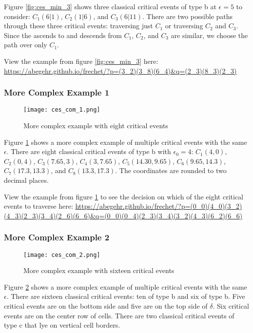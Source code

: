 Figure \ref{fig:ces_min_3} shows three classical critical events of type b at $\epsilon = 5$ to consider: $C_1(6|1)$, $C_2(1|6)$, and $C_3(6|11)$. There are two possible paths through these three critical events: traversing just $C_1$ or traversing $C_2$ and $C_3$. Since the ascends to and descends from $C_1$, $C_2$, and $C_3$ are similar, we choose the path over only $C_1$.

View the example from figure \ref{fig:ces_min_3} here: \url{https://abegehr.github.io/frechet/?p=(3_2)(3_8)(6_4)&q=(2_3)(8_3)(2_3)}


\subsubsection{More Complex Example 1}

\begin{figure}[H]
    \centering
    
    \texttt{[image: ces\_com\_1.png]}
		
	\caption{More complex example with eight critical events}
    \label{fig:ces_com_1}
\end{figure}

Figure \ref{fig:ces_com_1} shows a more complex example of multiple critical events with the same $\epsilon$. There are eight classical critical events of type b with $\epsilon_0 = 4$: $C_1(4, 0)$, $C_2(0, 4)$, $C_3(7.65, 3)$, $C_4(3, 7.65)$, $C_5(14.30, 9.65)$, $C_6(9.65, 14.3)$, $C_7(17.3, 13.3)$, and $C_8(13.3, 17.3)$. The coordinates are rounded to two decimal places. 

View the example from figure \ref{fig:ces_com_1} to see the decision on which of the eight critical events to traverse here: \url{https://abegehr.github.io/frechet/?p=(0_0)(4_0)(3_2)(4_3)(2_3)(3_4)(2_6)(6_6)&q=(0_0)(0_4)(2_3)(3_4)(3_2)(4_3)(6_2)(6_6)}


\subsubsection{More Complex Example 2}

\begin{figure}[H]
    \centering
    
    \texttt{[image: ces\_com\_2.png]}
		
	\caption{More complex example with sixteen critical events}
    \label{fig:ces_com_2}
\end{figure}

Figure \ref{fig:ces_com_2} shows a more complex example of multiple critical events with the same $\epsilon$. There are sixteen classical critical events: ten of type b and six of type b. Five critical events are on the bottom side and five are on the top side of $\delta$. Six critical events are on the center row of cells. There are two classical critical events of type c that lye on vertical cell borders.


